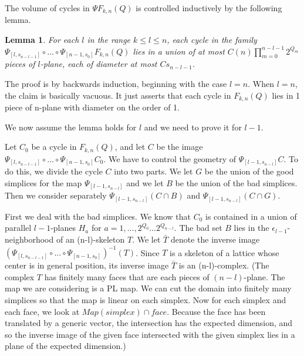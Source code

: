 \documentclass{amsart}
\newtheorem*{Theorem 1}{Theorem 1}
\newtheorem*{Theorem 2}{Theorem 2}
\newtheorem*{Theorem 1A}{Theorem 1A}
\newtheorem*{Theorem 2A}{Theorem 2A}
\newtheorem{lemma}{Lemma}[section]
\newtheorem*{vanishing lemma}{Vanishing Lemma}
\numberwithin{equation}{section}
\begin{document}
The volume of cycles in $\Psi F_{k,n}(Q)$
is controlled inductively by the following lemma.

\begin{lemma} For each $l$ in the range $k \le l \le n$, each cycle in the family
$\Psi_{[l, s_{n-l-1}]} \circ ... \circ \Psi_{[n-1, s_0]} F_{k,n}(Q)$ lies in a union
of at most $C(n) \prod_{m=0}^{n-l-1} 2^{Q_m}$ pieces of $l$-plane, 
each of diameter at most $C s_{n-l-1}$.
\end{lemma}

\proof The proof is by backwards induction, beginning with the case $l=n$.
When $l=n$, the claim is basically vacuous.  It just asserts that each cycle
in $F_{k,n}(Q)$ lies in 1 piece of n-plane
with diameter on the order of 1.

We now assume the lemma holds for $l$ and we need to prove it for $l-1$.

Let $C_0$ be a cycle in $F_{k,n}(Q)$, and let $C$
be the image $\Psi_{[l, s_{n-l-1}]} \circ ... \circ \Psi_{[n-1, s_0]} C_0$.  We
have to control the geometry of $\Psi_{[l-1, s_{n-l}]} C$.  To do this,
we divide the cycle $C$ into two parts.  We let $G$ be the union of the good
simplices for the map $\Psi_{[l-1, s_{n-l}]}$ and we let $B$ be the union
of the bad simplices.  Then we consider separately $\Psi_{[l-1, s_{n-l}]} (C \cap B)$
and $\Psi_{[l-1, s_{n-l}]} (C \cap G)$.

First we deal with the bad simplices.  We know that $C_0$ is
contained in a union of parallel $l-1$-planes $H_a$ for $a = 1,
..., 2^{Q_0} ... 2^{Q_{n-l}}$. The bad set $B$ lies in the
$\epsilon_{l-1}$-neighborhood of an (n-l)-skeleton $T$. We let
$\bar T$ denote the inverse image $(\Psi_{[l, s_{n-l-1}]} \circ
... \circ \Psi_{[n-1, s_0]})^{-1} (T)$.  Since $T$ is a skeleton
of a lattice whose center is in general position, its inverse
image $\bar T$ is an (n-l)-complex.  (The complex $T$ has
finitely many faces that are each pieces of $(n-l)$-plane.  The
map we are considering is a PL map. We can cut the domain into
finitely many simplices so that the map is linear on each
simplex.  Now for each simplex and each face, we look at
$Map(simplex) \cap face$.  Because the face has been translated
by a generic vector, the intersection has the expected dimension,
and so the inverse image of the given face intersected with the
given simplex lies in a plane of the expected dimension.) 
\end{document}
